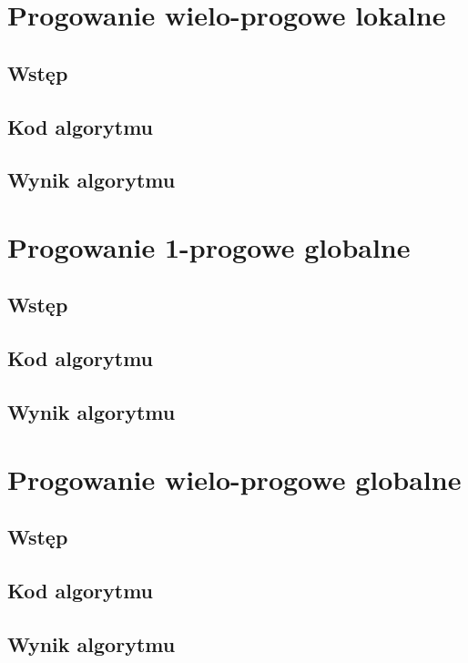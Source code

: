 \documentclass[a4paper,12pt]{book}
\begin{document}
\section{Progowanie wielo-progowe lokalne}
\subsection*{Wstęp}
\subsection*{Kod algorytmu}
\subsection*{Wynik algorytmu}

\section{Progowanie 1-progowe globalne}
\subsection*{Wstęp}
\subsection*{Kod algorytmu}
\subsection*{Wynik algorytmu}

\section{Progowanie wielo-progowe globalne}
\subsection*{Wstęp}
\subsection*{Kod algorytmu}
\subsection*{Wynik algorytmu}
\end{document}
